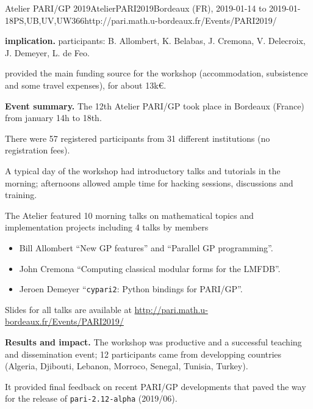 \begin{event}{Atelier PARI/GP 2019}{AtelierPARI2019}{Bordeaux (FR),
2019-01-14 to 2019-01-18}{PS,UB,UV,UW}{36}{6}{http://pari.math.u-bordeaux.fr/Events/PARI2019/}


\textbf{\ODK implication.} \ODK participants: B. Allombert, K. Belabas, J.
Cremona, V. Delecroix, J.  Demeyer, L. de Feo.

\ODK provided the main funding source for the workshop (accommodation,
subsistence and some travel expenses), for about 13k\euro.

\textbf{Event summary.} The 12th Atelier PARI/GP took place in Bordeaux
(France) from january 14h to 18th.

There were 57 registered participants from 31 different institutions
(no registration fees).

A typical day of the workshop had introductory talks and tutorials
in the morning; afternoons allowed ample time for hacking sessions,
discussions and training.

The Atelier featured 10 morning talks on mathematical topics and
implementation projects including 4 talks by \ODK members
\begin{itemize}
\item Bill Allombert ``New GP features'' and ``Parallel GP programming''.
\item John Cremona ``Computing classical modular forms for the LMFDB''.
\item Jeroen Demeyer ``\texttt{cypari2}: Python bindings for PARI/GP''.
\end{itemize}

Slides for all talks are available at
\url{http://pari.math.u-bordeaux.fr/Events/PARI2019/}

\textbf{Results and impact.} The workshop was productive and a successful
teaching and dissemination event; 12 participants came from developping
countries (Algeria, Djibouti, Lebanon, Morroco, Senegal, Tunisia,
Turkey).

It provided final feedback on recent PARI/GP developments that paved the way
for the release of \texttt{pari-2.12-alpha} (2019/06).


\end{event}
